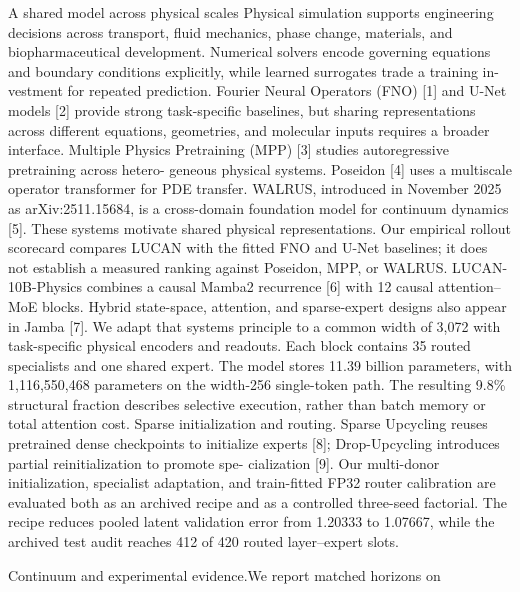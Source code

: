 \documentclass[11pt]{article}
\begin{document}
A shared model across physical scales
Physical simulation supports engineering decisions across transport, fluid mechanics, phase
change, materials, and biopharmaceutical development. Numerical solvers encode governing
equations and boundary conditions explicitly, while learned surrogates trade a training in-
vestment for repeated prediction. Fourier Neural Operators (FNO) [1] and U-Net models [2]
provide strong task-specific baselines, but sharing representations across different equations,
geometries, and molecular inputs requires a broader interface.
Multiple Physics Pretraining (MPP) [3] studies autoregressive pretraining across hetero-
geneous physical systems. Poseidon [4] uses a multiscale operator transformer for PDE
transfer. WALRUS, introduced in November 2025 as arXiv:2511.15684, is a cross-domain
foundation model for continuum dynamics [5]. These systems motivate shared physical
representations. Our empirical rollout scorecard compares LUCAN with the fitted FNO
and U-Net baselines; it does not establish a measured ranking against Poseidon, MPP, or
WALRUS.
LUCAN-10B-Physics combines a causal Mamba2 recurrence [6] with 12 causal attention–
MoE blocks. Hybrid state-space, attention, and sparse-expert designs also appear in
Jamba [7]. We adapt that systems principle to a common width of 3,072 with task-specific
physical encoders and readouts. Each block contains 35 routed specialists and one shared
expert. The model stores 11.39 billion parameters, with 1,116,550,468 parameters on the
width-256 single-token path. The resulting 9.8\% structural fraction describes selective
execution, rather than batch memory or total attention cost.
Sparse initialization and routing. Sparse Upcycling reuses pretrained dense checkpoints
to initialize experts [8]; Drop-Upcycling introduces partial reinitialization to promote spe-
cialization [9]. Our multi-donor initialization, specialist adaptation, and train-fitted FP32
router calibration are evaluated both as an archived recipe and as a controlled three-seed
factorial. The recipe reduces pooled latent validation error from 1.20333 to 1.07667, while
the archived test audit reaches 412 of 420 routed layer–expert slots.

\noindent Continuum and experimental evidence.\quad We report matched horizons on\par
\end{document}
